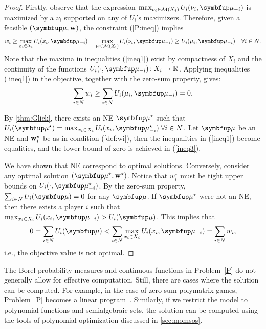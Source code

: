 \begin{proof}
    Firstly, observe that the expression $\max_{\nu_i \in \calM(X_i)} U_i(\nu_i, \bmu_{-i})$ is maximized by a $\nu_i$ supported on any of $U_i$'s maximizers. Therefore, given a feasible $(\bmu, \bw)$, the constraint (\ref{P:ineq}) implies
    \begin{equation}\label{ineq1}
        w_i \geq \max_{x_i \in X_i} U_i(x_i, \bmu_{-i}) = \max_{\nu_i \in \calM(X_i)} U_i(\nu_i, \bmu_{-i}) \geq U_i(\mu_i, \bmu_{-i}) \quad \forall i \in N.
    \end{equation}
    Note that the maxima in inequalities (\ref{ineq1}) exist by compactness of $X_i$ and the continuity of the functions $U_i(\cdot, \bmu_{-i}) \colon X_i \to \R$. Applying inequalities (\ref{ineq1}) in the objective, together with the zero-sum property, gives:
    \begin{equation}\label{ineq3}
        \sum_{i \in N} w_i \geq \sum_{i \in N} U_i(\mu_i, \bmu_{-i}) = 0.
    \end{equation}

    By \cref{thm:Glick}, there exists an NE $\bmu^\star$ such that $U_i(\bmu^\star) = \max_{x_i \in X_i} U_i(x_i, \bmu_{-i}^\star) \; \forall i \in N$. Let $\bmu$ be an NE and $\mathbf{w}^\star_i$ be as in condition (\ref{def:wi}), then the inequalities in (\ref{ineq1}) become equalities, and the lower bound of zero is achieved in (\ref{ineq3}).

    We have shown that NE correspond to optimal solutions. Conversely, consider any optimal solution $(\bmu^\star, \bw^\star)$. Notice that $w_i^\star$ must be tight upper bounds on $U_i(\cdot, \bmu_{-i}^\star)$. By the zero-sum property, $\sum_{i \in N} U_i(\bmu) = 0$ for any $\bmu$. If $\bmu^\star$ were not an NE, then there exists a player $i$ such that $\max_{x_i \in X_i} U_i(x_i, \bmu_{-i}) > U_i(\bmu)$. This implies that
    \[
        0 = \sum_{i \in N} U_i(\bmu) < \sum_{i \in N} \max_{x_i \in X_i} U_i(x_i, \bmu_{-i}) = \sum_{i \in N} w_i,
    \]
    i.e., the objective value is not optimal.
\end{proof}

The Borel probability measures and continuous functions in Problem~\ref{P} do not generally allow for effective computation. Still, there are cases where the solution can be computed. For example, in the case of zero-sum polymatrix games, Problem~\ref{P} becomes a linear program~\cite{Cai16}. Similarly, if we restrict the model to polynomial functions and semialgebraic sets, the solution can be computed using the tools of polynomial optimization discussed in \cref{sec:momsos}.